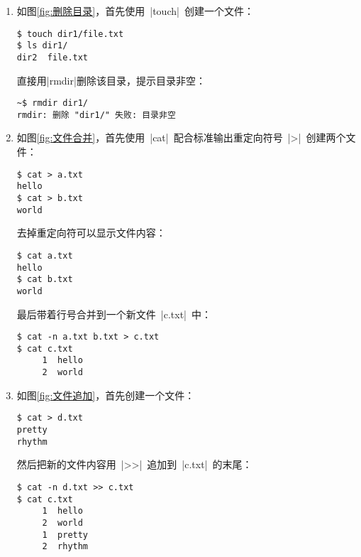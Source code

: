 \documentclass[cs4size,a4paper,nofonts]{ctexart}
\begin{document}
\begin{enumerate}
\begin{figure}[htp]
\end{figure}

\item 如图\ref{fig:删除目录}，首先使用~|touch|~创建一个文件：
\begin{Verbatim}
$ touch dir1/file.txt
$ ls dir1/
dir2  file.txt
\end{Verbatim}
直接用|rmdir|删除该目录，提示目录非空：
\begin{Verbatim}
~$ rmdir dir1/
rmdir: 删除 "dir1/" 失败: 目录非空
\end{Verbatim}

\begin{figure}[htp]
\end{figure}

\item 如图\ref{fig:文件合并}，首先使用~|cat|~配合标准输出重定向符号~|>|~创建两个文件：
\begin{Verbatim}
$ cat > a.txt
hello
$ cat > b.txt
world
\end{Verbatim}
去掉重定向符可以显示文件内容：
\begin{Verbatim}
$ cat a.txt
hello
$ cat b.txt
world
\end{Verbatim}
最后带着行号合并到一个新文件~|c.txt|~中：
\begin{Verbatim}
$ cat -n a.txt b.txt > c.txt
$ cat c.txt 
     1	hello
     2	world
\end{Verbatim}

\begin{figure}[htp]
\end{figure}

\item 如图\ref{fig:文件追加}，首先创建一个文件：
\begin{Verbatim}
$ cat > d.txt
pretty
rhythm   
\end{Verbatim}
然后把新的文件内容用~|>>|~追加到~|c.txt|~的末尾：
\begin{Verbatim}
$ cat -n d.txt >> c.txt
$ cat c.txt 
     1	hello
     2	world
     1	pretty
     2	rhythm
\end{Verbatim}

\begin{figure}[htp]
\end{figure}


\end{enumerate}
\end{document}
